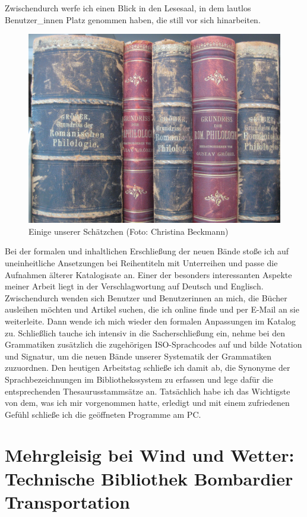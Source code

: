 \documentclass[a4paper,
fontsize=11pt,
oneside,
numbers=noperiodatend,
parskip=half-,
bibliography=totoc,
final
]{scrartcl}
\begin{document}
Zwischendurch werfe ich einen Blick in den Lesesaal, in dem lautlos
Benutzer\_innen Platz genommen haben, die still vor sich hinarbeiten.

\begin{figure}
\centering
\includegraphics{img/Beckmann_2.jpg}
\caption{Einige unserer Schätzchen (Foto: Christina Beckmann)}
\end{figure}

Bei der formalen und inhaltlichen Erschließung der neuen Bände stoße ich
auf uneinheitliche Ansetzungen bei Reihentiteln mit Unterreihen und
passe die Aufnahmen älterer Katalogisate an. Einer der besonders
interessanten Aspekte meiner Arbeit liegt in der Verschlagwortung auf
Deutsch und Englisch. Zwischendurch wenden sich Benutzer und
Benutzerinnen an mich, die Bücher ausleihen möchten und Artikel suchen,
die ich online finde und per E-Mail an sie weiterleite. Dann wende ich
mich wieder den formalen Anpassungen im Katalog zu. Schließlich tauche
ich intensiv in die Sacherschließung ein, nehme bei den Grammatiken
zusätzlich die zugehörigen ISO-Sprachcodes auf und bilde Notation und
Signatur, um die neuen Bände unserer Systematik der Grammatiken
zuzuordnen. Den heutigen Arbeitstag schließe ich damit ab, die Synonyme
der Sprachbezeichnungen im Bibliothekssystem zu erfassen und lege dafür
die entsprechenden Thesaurusstammsätze an. Tatsächlich habe ich das
Wichtigste von dem, was ich mir vorgenommen hatte, erledigt und mit
einem zufriedenen Gefühl schließe ich die geöffneten Programme am PC.

\newpage

\hypertarget{mehrgleisig-bei-wind-und-wetter-technische-bibliothek-bombardier-transportation}{%
\section{Mehrgleisig bei Wind und Wetter: Technische Bibliothek
Bombardier
Transportation}\label{mehrgleisig-bei-wind-und-wetter-technische-bibliothek-bombardier-transportation}}
\end{document}

